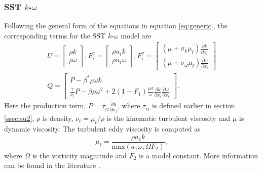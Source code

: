 \subsubsection{SST $k$-$\omega$}
\noindent Following the general form of the equations in equation \ref{eq:generic}, the corresponding terms for the SST $k$-$\omega$\cite{wilcox1998turbulence} model are
\begin{align}
    U=\begin{bmatrix}{}
    \rho k \\
    \rho\omega
    \end{bmatrix},
    F_i^c = \begin{bmatrix}{}
    \rho u_i k \\
    \rho u_i \omega
    \end{bmatrix},
    F^v_i = \begin{bmatrix}{}
    (\mu + \sigma_k \mu_t) \frac{\partial k}{\partial x_i} \\
    (\mu + \sigma_{\omega} \mu_t) \frac{\partial \omega}{\partial x_i}
    \end{bmatrix} \nonumber \\
    Q = \begin{bmatrix}{}
    P - \beta^* \rho\omega k \\
    \frac{\gamma}{\nu_t}P - \beta \rho \omega^2 + 2(1-F_1)\frac{\rho\sigma}{\omega}{\frac{\partial k}{\partial x_i}}{\frac{\partial \omega}{\partial x_i}}
    \end{bmatrix}.
\end{align}{}
Here the production term, $P = \tau_{ij} \frac{\partial u}{\partial x_j}$, where $\tau_{ij}$ is defined earlier in section \ref{ssec:su2}, $\rho$ is density, $\nu_t = \mu_t/\rho$ is the kinematic turbulent viscosity and $\mu$ is dynamic viscosity. The turbulent eddy viscosity is computed as
\begin{equation}
    \mu_t = \frac{\rho a_1 k}{\text{max}(a_1 \omega, \Omega F_2)},
    \label{eq:kweddyvisc}
\end{equation}{}
where $\Omega$ is the vorticity magnitude and $F_2$ is a model constant. More information can be found in the literature \cite{wilcox1998turbulence}.

